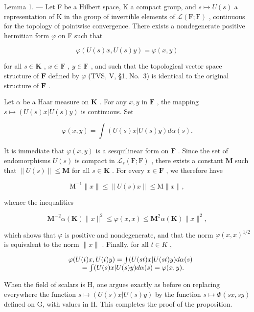 Lemma 1. --- Let F be a Hilbert space, K a compact group, and \(s \mapsto U(s)\) a representation of K in the group of invertible elements of \(\mathcal{L}(\mathrm{F};\mathrm{F})\) , continuous for the topology of pointwise convergence. There exists a nondegenerate positive hermitian form \(\varphi\) on F such that

\[
\varphi (U (s) x, U (s) y) = \varphi (x, y)
\]

for all \(s \in \mathbf{K}\) , \(x \in \mathbf{F}\) , \(y \in \mathbf{F}\) , and such that the topological vector space structure of \(\mathbf{F}\) defined by \(\varphi\) (TVS, V, §1, No.~3) is identical to the original structure of \(\mathbf{F}\) .

Let \(\alpha\) be a Haar measure on \(\mathbf{K}\) . For any \(x, y\) in \(\mathbf{F}\) , the mapping \(s \mapsto (U(s)x|U(s)y)\) is continuous. Set

\[
\varphi (x, y) = \int (U (s) x | U (s) y) d \alpha (s).
\]

It is immediate that \(\varphi(x,y)\) is a sesquilinear form on \(\mathbf{F}\) . Since the set of endomorphisms \(U(s)\) is compact in \(\mathcal{L}_s(\mathrm{F};\mathrm{F})\) , there exists a constant \(\mathbf{M}\) such that \(\| U(s)\| \leqslant \mathbf{M}\) for all \(s\in \mathbf{K}\) . For every \(x\in \mathbf{F}\) , we therefore have

\[
\mathrm{M} ^ {- 1} \| x \| \leqslant \| U (s) x \| \leqslant \mathrm{M} \| x \|,
\]

whence the inequalities

\[
\mathbf {M} ^ {- 2} \alpha (\mathbf {K}) \| x \| ^ {2} \leqslant \varphi (x, x) \leqslant \mathbf {M} ^ {2} \alpha (\mathbf {K}) \| x \| ^ {2},
\]

which shows that \(\varphi\) is positive and nondegenerate, and that the norm \(\varphi(x,x)^{1/2}\) is equivalent to the norm \(\|x\|\) . Finally, for all \(t \in K\) ,

\[
\begin{array}{r l} & {\varphi (U (t) x, U (t) y) = \int (U (s t) x | U (s t) y) d \alpha (s)} \\ & {\qquad = \int (U (s) x | U (s) y) d \alpha (s) = \varphi (x, y).} \end{array}
\]

When the field of scalars is H, one argues exactly as before on replacing everywhere the function \(s \mapsto (U(s)x|U(s)y)\) by the function \(s \mapsto \Phi(sx, sy)\) defined on G, with values in H. This completes the proof of the proposition.

